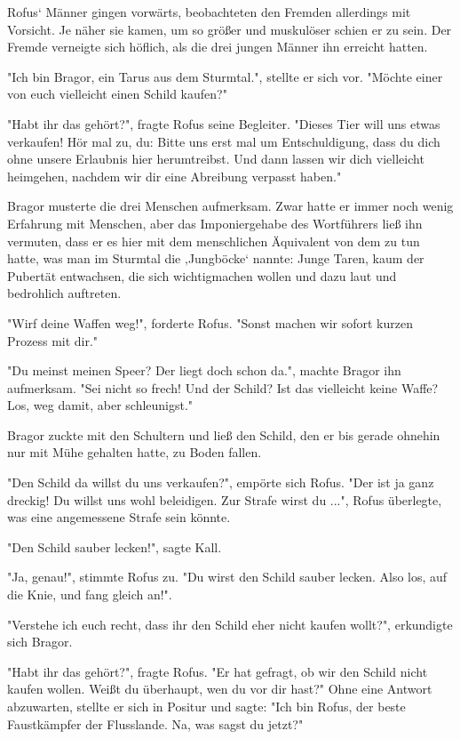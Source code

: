 \documentclass[10pt, a4paper, oneside]{book}
\begin{document}
\begin{multicols}{2}
Rofus‘ Männer gingen vorwärts, beobachteten den Fremden allerdings mit Vorsicht. Je näher sie kamen, um so größer und muskulöser schien er zu sein. Der Fremde verneigte sich höflich, als die drei jungen Männer ihn erreicht 
hatten.

"Ich bin Bragor, ein Tarus aus dem Sturmtal.", stellte er sich vor. "Möchte einer von euch vielleicht einen Schild kaufen?"

"Habt ihr das gehört?", fragte Rofus seine Begleiter. "Dieses Tier will uns etwas 
verkaufen! Hör mal zu, du: Bitte uns erst mal um Entschuldigung, dass du dich ohne unsere Erlaubnis hier herumtreibst. Und dann lassen wir dich vielleicht heimgehen, nachdem wir dir eine Abreibung verpasst haben." 

Bragor musterte die drei Menschen aufmerksam. Zwar hatte er immer noch wenig Erfahrung mit Menschen, aber das Imponiergehabe des Wortführers ließ ihn vermuten, dass er es hier mit dem menschlichen Äquivalent von dem zu tun hatte, was man im Sturmtal die ‚Jungböcke‘ nannte: Junge Taren, kaum der Pubertät entwachsen, die sich wichtigmachen wollen und dazu laut und bedrohlich auftreten. 

"Wirf deine Waffen weg!", forderte Rofus. "Sonst machen wir sofort kurzen Prozess mit dir." 

"Du meinst meinen Speer? Der liegt doch schon da.", machte Bragor ihn aufmerksam. 
"Sei nicht so frech! Und der Schild? Ist das vielleicht keine Waffe? Los, weg damit, aber schleunigst." 

Bragor zuckte mit den Schultern und ließ den Schild, den er bis gerade ohnehin nur mit Mühe gehalten hatte, zu Boden fallen. 

"Den Schild da willst du uns verkaufen?", empörte sich Rofus. "Der ist ja ganz dreckig! Du willst uns wohl beleidigen. Zur Strafe wirst du ...", Rofus überlegte, was eine angemessene Strafe sein könnte. 

"Den Schild sauber lecken!", sagte Kall. 

"Ja, genau!", stimmte Rofus zu. "Du wirst den Schild sauber lecken. Also los, auf die Knie, und fang gleich an!". 

"Verstehe ich euch recht, dass ihr den Schild eher nicht kaufen wollt?", erkundigte sich Bragor. 

"Habt ihr das gehört?", fragte Rofus. "Er hat gefragt, ob wir den Schild nicht kaufen wollen. Weißt du überhaupt, wen du vor dir hast?" Ohne eine Antwort abzuwarten, stellte er sich in Positur und sagte: "Ich bin Rofus, der beste Faustkämpfer der Flusslande. Na, was sagst du jetzt?" 


\end{multicols}
\end{document}
